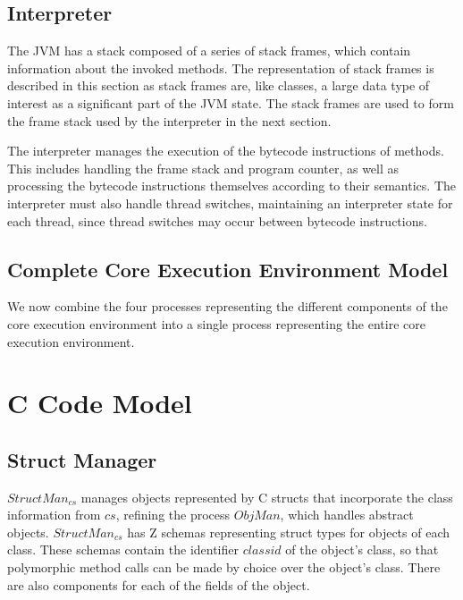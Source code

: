 

\subsection{Interpreter}
\label{cee-interpreter-subsection}

The JVM has a stack composed of a series of stack frames, which
contain information about the invoked methods.
The representation of stack frames is described in this section as
stack frames are, like classes, a large data type of interest as a
significant part of the JVM state.
The stack frames are used to form the frame stack used by the
interpreter in the next section.



The interpreter manages the execution of the bytecode instructions of
methods.
This includes handling the frame stack and program counter, as well as
processing the bytecode instructions themselves according to their
semantics.
The interpreter must also handle thread switches, maintaining an
interpreter state for each thread, since thread switches may occur
between bytecode instructions.





\subsection{Complete Core Execution Environment Model}
\label{complete-cee-subsection}

We now combine the four \Circus{} processes representing the different
components of the core execution environment into a single \Circus{}
process representing the entire core execution environment.



\section{C Code Model}
\label{cee-c-code-section}

\subsection{Struct Manager}
\label{cee-struct-manager-subsection}

$StructMan_{cs}$ manages objects represented by C structs that
incorporate the class information from $cs$, refining the process
$ObjMan$, which handles abstract objects.
$StructMan_{cs}$ has Z schemas representing struct types for objects
of each class.
%
%
These schemas contain the identifier $classid$ of the object's class, so
that polymorphic method calls can be made by choice over the object's
class. 
There are also components for each of the fields of the
object.

